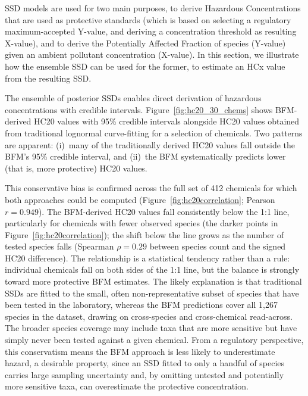 SSD models are used for two main purposes,  to derive Hazardous Concentrations that are used as protective standards (which is based on selecting a regulatory maximum-accepted Y-value, and deriving a concentration threshold as resulting X-value), and to derive the Potentially Affected Fraction of species (Y-value) given an ambient pollutant concentration (X-value). In this section, we illustrate how the ensemble SSD can be used for the former, to estimate an HCx value from the resulting SSD.


The ensemble of posterior SSDs enables direct derivation of hazardous concentrations with credible intervals. Figure~\ref{fig:hc20_30_chems} shows BFM-derived HC20 values with 95\% credible intervals alongside HC20 values obtained from traditional lognormal curve-fitting for a selection of chemicals. Two patterns are apparent: (i)~many of the traditionally derived HC20 values fall outside the BFM's 95\% credible interval, and (ii)~the BFM systematically predicts lower (that is, more protective) HC20 values.

This conservative bias is confirmed across the full set of 412 chemicals for which both approaches could be computed (Figure~\ref{fig:hc20correlation}; Pearson $r = 0.949$). The BFM-derived HC20 values fall consistently below the 1:1 line, particularly for chemicals with fewer observed species (the darker points in Figure~\ref{fig:hc20correlation}); the shift below the line grows as the number of tested species falls (Spearman $\rho = 0.29$ between species count and the signed HC20 difference). The relationship is a statistical tendency rather than a rule: individual chemicals fall on both sides of the 1:1 line, but the balance is strongly toward more protective BFM estimates. The likely explanation is that traditional SSDs are fitted to the small, often non-representative subset of species that have been tested in the laboratory, whereas the BFM predictions cover all 1{,}267 species in the dataset, drawing on cross-species and cross-chemical read-across. The broader species coverage may include taxa that are more sensitive but have simply never been tested against a given chemical. From a regulatory perspective, this conservatism means the BFM approach is less likely to underestimate hazard, a desirable property, since an SSD fitted to only a handful of species carries large sampling uncertainty and, by omitting untested and potentially more sensitive taxa, can overestimate the protective concentration.

